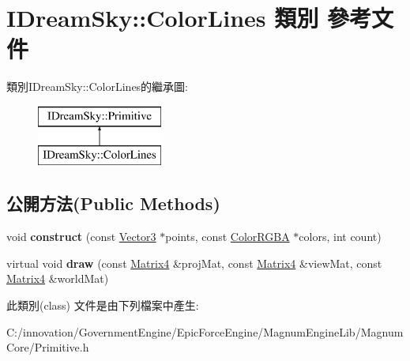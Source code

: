 \hypertarget{class_i_dream_sky_1_1_color_lines}{}\section{I\+Dream\+Sky\+:\+:Color\+Lines 類別 參考文件}
\label{class_i_dream_sky_1_1_color_lines}
類別\+I\+Dream\+Sky\+:\+:Color\+Lines的繼承圖\+:\begin{figure}[H]
\begin{center}
\leavevmode
\includegraphics[height=2.000000cm]{class_i_dream_sky_1_1_color_lines}
\end{center}
\end{figure}
\subsection*{公開方法(Public Methods)}
\begin{DoxyCompactItemize}
\item 
void {\bfseries construct} (const \hyperlink{class_i_dream_sky_1_1_vector3}{Vector3} $\ast$points, const \hyperlink{class_i_dream_sky_1_1_color_r_g_b_a}{Color\+R\+G\+BA} $\ast$colors, int count)\hypertarget{class_i_dream_sky_1_1_color_lines_a554da42d350f78047aead6ce0ad7e2e7}{}\label{class_i_dream_sky_1_1_color_lines_a554da42d350f78047aead6ce0ad7e2e7}

\item 
virtual void {\bfseries draw} (const \hyperlink{class_i_dream_sky_1_1_matrix4}{Matrix4} \&proj\+Mat, const \hyperlink{class_i_dream_sky_1_1_matrix4}{Matrix4} \&view\+Mat, const \hyperlink{class_i_dream_sky_1_1_matrix4}{Matrix4} \&world\+Mat)\hypertarget{class_i_dream_sky_1_1_color_lines_a24af26cfe5a3424986388c1505909f16}{}\label{class_i_dream_sky_1_1_color_lines_a24af26cfe5a3424986388c1505909f16}

\end{DoxyCompactItemize}


此類別(class) 文件是由下列檔案中產生\+:\begin{DoxyCompactItemize}
\item 
C\+:/innovation/\+Government\+Engine/\+Epic\+Force\+Engine/\+Magnum\+Engine\+Lib/\+Magnum\+Core/Primitive.\+h\end{DoxyCompactItemize}
